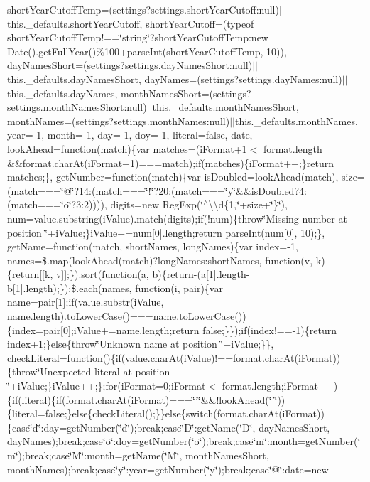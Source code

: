 {{\begin{DoxyParamCaption}
short\+Year\+Cutoff\+Temp=(settings?settings.\+short\+Year\+Cutoff\+:null)$\vert$$\vert$this.\+\_\+defaults.\+short\+Year\+Cutoff, short\+Year\+Cutoff=(typeof short\+Year\+Cutoff\+Temp!==\char`\"{}string\char`\"{}?short\+Year\+Cutoff\+Temp\+:new Date().\+get\+Full\+Year()\%100+parse\+Int(short\+Year\+Cutoff\+Temp, 10)), day\+Names\+Short=(settings?settings.\+day\+Names\+Short\+:null)$\vert$$\vert$this.\+\_\+defaults.\+day\+Names\+Short, day\+Names=(settings?settings.\+day\+Names\+:null)$\vert$$\vert$this.\+\_\+defaults.\+day\+Names, month\+Names\+Short=(settings?settings.\+month\+Names\+Short\+:null)$\vert$$\vert$this.\+\_\+defaults.\+month\+Names\+Short, month\+Names=(settings?settings.\+month\+Names\+:null)$\vert$$\vert$this.\+\_\+defaults.\+month\+Names, year=-\/1, month=-\/1, day=-\/1, doy=-\/1, literal=false, date, look\+Ahead=function(match)\{var matches=(i\+Format+1$<$ format.\+length \&\&format.\+char\+At(i\+Format+1)===match);if(matches)\{i\+Format++;\}return matches;\}, get\+Number=function(match)\{var is\+Doubled=look\+Ahead(match), size=(match===\char`\"{}@\char`\"{}?14\+:(match===\char`\"{}!\char`\"{}?20\+:(match===\char`\"{}y\char`\"{}\&\&is\+Doubled?4\+:(match===\char`\"{}o\char`\"{}?3\+:2)))), digits=new Reg\+Exp(\char`\"{}$^\wedge$\textbackslash{}\textbackslash{}d\{1,\char`\"{}+size+\char`\"{}\}\char`\"{}), num=value.\+substring(i\+Value).\+match(digits);if(!num)\{throw\char`\"{}\+Missing number at position \char`\"{}+i\+Value;\}i\+Value+=num\mbox{[}0\mbox{]}.\+length;return parse\+Int(num\mbox{[}0\mbox{]}, 10);\}, get\+Name=function(match, short\+Names, long\+Names)\{var index=-\/1, names=\$.\+map(look\+Ahead(match)?long\+Names\+:short\+Names, function(v, k)\{return\mbox{[}\mbox{[}k, v\mbox{]}\mbox{]};\}).\+sort(function(a, b)\{return-\/(a\mbox{[}1\mbox{]}.\+length-\/b\mbox{[}1\mbox{]}.\+length);\});\$.\+each(names, function(i, pair)\{var name=pair\mbox{[}1\mbox{]};if(value.\+substr(i\+Value, name.\+length).\+to\+Lower\+Case()===name.\+to\+Lower\+Case())\{index=pair\mbox{[}0\mbox{]};i\+Value+=name.\+length;return false;\}\});if(index!==-\/1)\{return index+1;\}else\{throw\char`\"{}\+Unknown name at position \char`\"{}+i\+Value;\}\}, check\+Literal=function()\{if(value.\+char\+At(i\+Value)!==format.\+char\+At(i\+Format))\{throw\char`\"{}\+Unexpected literal at position \char`\"{}+i\+Value;\}i\+Value++;\};for(i\+Format=0;i\+Format$<$ format.\+length;i\+Format++)\{if(literal)\{if(format.\+char\+At(i\+Format)===\char`\"{}'\char`\"{}\&\&!look\+Ahead(\char`\"{}'\char`\"{}))\{literal=false;\}else\{check\+Literal();\}\}else\{switch(format.\+char\+At(i\+Format))\{case\char`\"{}d\char`\"{}\+:day=get\+Number(\char`\"{}d\char`\"{});break;case\char`\"{}\+D\char`\"{}\+:get\+Name(\char`\"{}\+D\char`\"{}, day\+Names\+Short, day\+Names);break;case\char`\"{}o\char`\"{}\+:doy=get\+Number(\char`\"{}o\char`\"{});break;case\char`\"{}m\char`\"{}\+:month=get\+Number(\char`\"{}m\char`\"{});break;case\char`\"{}\+M\char`\"{}\+:month=get\+Name(\char`\"{}\+M\char`\"{}, month\+Names\+Short, month\+Names);break;case\char`\"{}y\char`\"{}\+:year=get\+Number(\char`\"{}y\char`\"{});break;case\char`\"{}@\char`\"{}\+:date=new 
\end{DoxyParamCaption}}}
